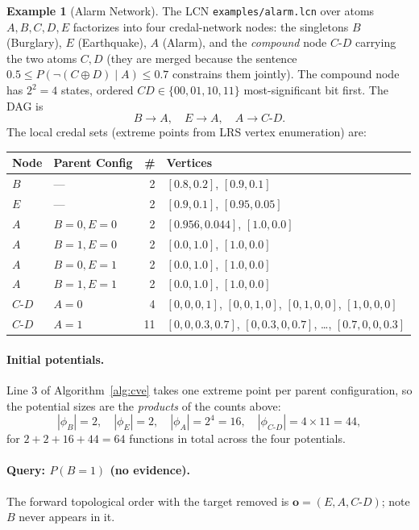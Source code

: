 \documentclass[11pt]{article}
\theoremstyle{definition}
\newtheorem{example}{Example}
\newcommand{\bo}{\mathbf{o}}
\begin{document}
\begin{example}[Alarm Network]
The LCN \texttt{examples/alarm.lcn} over atoms $A, B, C, D, E$ factorizes into
four credal-network nodes: the singletons $B$ (Burglary), $E$ (Earthquake),
$A$ (Alarm), and the \emph{compound} node $C\text{-}D$ carrying the two atoms
$C, D$ (they are merged because the sentence
$0.5 \le P(\neg(C \oplus D) \mid A) \le 0.7$ constrains them jointly). The
compound node has $2^2 = 4$ states, ordered $CD \in \{00, 01, 10, 11\}$
most-significant bit first. The DAG is
\[
  B \to A, \quad E \to A, \quad A \to C\text{-}D .
\]
The local credal sets (extreme points from LRS vertex enumeration) are:

\begin{center}
\begin{tabular}{llr@{\hskip 1em}l}
\toprule
\textbf{Node} & \textbf{Parent Config} & \textbf{\#} & \textbf{Vertices} \\
\midrule
$B$ & --- & 2 & $[0.8, 0.2]$, $[0.9, 0.1]$ \\
$E$ & --- & 2 & $[0.9, 0.1]$, $[0.95, 0.05]$ \\
$A$ & $B{=}0, E{=}0$ & 2 & $[0.956, 0.044]$, $[1.0, 0.0]$ \\
$A$ & $B{=}1, E{=}0$ & 2 & $[0.0, 1.0]$, $[1.0, 0.0]$ \\
$A$ & $B{=}0, E{=}1$ & 2 & $[0.0, 1.0]$, $[1.0, 0.0]$ \\
$A$ & $B{=}1, E{=}1$ & 2 & $[0.0, 1.0]$, $[1.0, 0.0]$ \\
$C\text{-}D$ & $A{=}0$ & 4 & $[0,0,0,1]$, $[0,0,1,0]$, $[0,1,0,0]$, $[1,0,0,0]$ \\
$C\text{-}D$ & $A{=}1$ & 11 & $[0,0,0.3,0.7]$, $[0,0.3,0,0.7]$, \dots, $[0.7,0,0,0.3]$ \\
\bottomrule
\end{tabular}
\end{center}

\paragraph{Initial potentials.}
Line 3 of Algorithm~\ref{alg:cve} takes one extreme point per parent
configuration, so the potential sizes are the \emph{products} of the counts
above:
\[
  |\phi_B| = 2, \quad |\phi_E| = 2, \quad
  |\phi_A| = 2^4 = 16, \quad
  |\phi_{C\text{-}D}| = 4 \times 11 = 44 ,
\]
for $2 + 2 + 16 + 44 = 64$ functions in total across the four potentials.

\paragraph{Query: $P(B{=}1)$ (no evidence).}
The forward topological order with the target removed is
$\bo = (E, A, C\text{-}D)$; note $B$ never appears in it.


\end{example}
\end{document}
